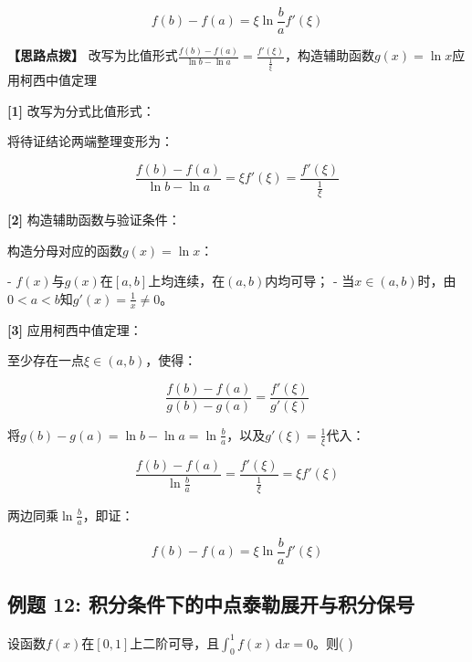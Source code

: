 \documentclass[11pt,a4paper,UTF8]{ctexart}
\begin{document}
\begin{equation*}
f(b) - f(a) = \xi \ln\frac{b}{a} f'(\xi)
\end{equation*}

\textbf{\color{DeepPurple}【思路点拨】} 改写为比值形式$\frac{f(b)-f(a)}{\ln b - \ln a} = \frac{f'(\xi)}{\frac{1}{\xi}}$，构造辅助函数$g(x) = \ln x$应用柯西中值定理


\begin{solbox}[分步推导与答题规范]
\textbf{[1]} 改写为分式比值形式：

将待证结论两端整理变形为：


\begin{equation*}
\frac{f(b) - f(a)}{\ln b - \ln a} = \xi f'(\xi) = \frac{f'(\xi)}{\frac{1}{\xi}}
\end{equation*}


\textbf{[2]} 构造辅助函数与验证条件：

构造分母对应的函数$g(x) = \ln x$：

- $f(x)$与$g(x)$在$[a, b]$上均连续，在$(a, b)$内均可导；
- 当$x \in (a, b)$时，由$0 < a < b$知$g'(x) = \frac{1}{x} \neq 0$。

\textbf{[3]} 应用柯西中值定理：

至少存在一点$\xi \in (a, b)$，使得：


\begin{equation*}
\frac{f(b) - f(a)}{g(b) - g(a)} = \frac{f'(\xi)}{g'(\xi)}
\end{equation*}


将$g(b) - g(a) = \ln b - \ln a = \ln\frac{b}{a}$，以及$g'(\xi) = \frac{1}{\xi}$代入：


\begin{equation*}
\frac{f(b) - f(a)}{\ln\frac{b}{a}} = \frac{f'(\xi)}{\frac{1}{\xi}} = \xi f'(\xi)
\end{equation*}


两边同乘$\ln\frac{b}{a}$，即证：


\begin{equation*}
f(b) - f(a) = \xi \ln\frac{b}{a} f'(\xi)
\end{equation*}

\end{solbox}


\subsection{例题 12: 积分条件下的中点泰勒展开与积分保号}

设函数$f(x)$在$[0, 1]$上二阶可导，且$\int_0^1 f(x)\,\mathrm{d}x = 0$。则( )
\end{document}
